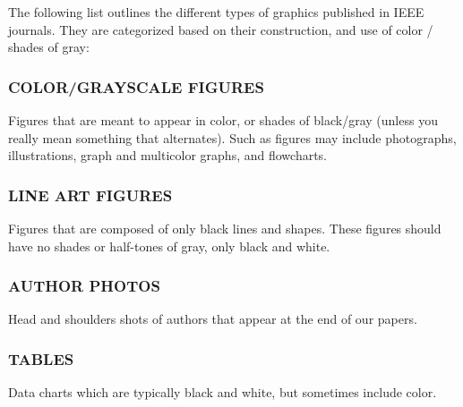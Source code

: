 \documentclass{IEEEojcsys}
\begin{document}
The following list outlines the different types of graphics published in IEEE journals. They are categorized based on their construction, and use of color / shades of gray:

\subsubsection{COLOR/GRAYSCALE FIGURES}
Figures  that  are  meant  to  appear  in  color,  or  shades  of black/gray (unless   you   really   mean   something   that alternates).  Such as figures  may  include  photographs, illustrations, graph and multicolor graphs, and flowcharts.


\subsubsection{LINE ART FIGURES}

Figures that are composed of only black lines and shapes. These figures should have no shades or half-tones of gray, 
only black and white.

\subsubsection{AUTHOR PHOTOS}

Head and shoulders shots of authors that appear at the end of our papers.

\subsubsection{TABLES}
Data charts which are typically black and white, but sometimes include color.
\end{document}
